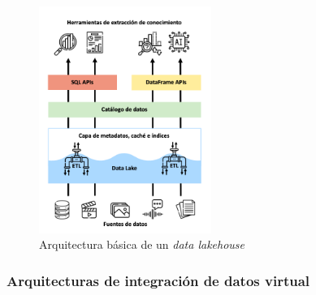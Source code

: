 \begin{figure}[h!]
    \centering
    \includegraphics[width=0.5\textwidth]{Images/dlh-architecture.png}
    \caption{Arquitectura básica de un \textit{data lakehouse}}
    \label{fig:dlh-architecture}
\end{figure}


\subsubsection{Arquitecturas de integración de datos virtual}







